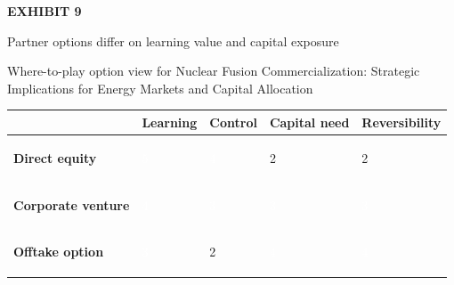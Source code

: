 \documentclass[10pt,a4paper]{article}
\begin{document}
\clearpage
{\textcolor{BOGreen}{\scriptsize\bfseries EXHIBIT 9}}\par\vspace{4pt}
{\sffamily\fontsize{17}{21}\selectfont\color{BONavy} Partner options differ on learning value and capital exposure}\par
{\small\color{BOText} Where-to-play option view for Nuclear Fusion Commercialization: Strategic Implications for Energy Markets and Capital Allocation}\par\vspace{6pt}
{\scriptsize\begin{tabular}{p{38mm}>{\centering\arraybackslash}p{21mm}>{\centering\arraybackslash}p{21mm}>{\centering\arraybackslash}p{21mm}>{\centering\arraybackslash}p{21mm}}
 & {\bfseries Learning} & {\bfseries Control} & {\bfseries Capital need} & {\bfseries Reversibility} \\
\hline
{\bfseries Direct equity} & \colorbox{BOGreen}{\textcolor{white}{\strut\hspace{5pt}5\hspace{5pt}}} & \colorbox{BOGreen}{\textcolor{white}{\strut\hspace{5pt}4\hspace{5pt}}} & \colorbox{BOLight}{\textcolor{BOText}{\strut\hspace{5pt}2\hspace{5pt}}} & \colorbox{BOLight}{\textcolor{BOText}{\strut\hspace{5pt}2\hspace{5pt}}} \\
{\bfseries Corporate venture} & \colorbox{BOGreen}{\textcolor{white}{\strut\hspace{5pt}4\hspace{5pt}}} & \colorbox{BOBlue}{\textcolor{white}{\strut\hspace{5pt}3\hspace{5pt}}} & \colorbox{BOBlue}{\textcolor{white}{\strut\hspace{5pt}3\hspace{5pt}}} & \colorbox{BOBlue}{\textcolor{white}{\strut\hspace{5pt}3\hspace{5pt}}} \\
{\bfseries Offtake option} & \colorbox{BOBlue}{\textcolor{white}{\strut\hspace{5pt}3\hspace{5pt}}} & \colorbox{BOLight}{\textcolor{BOText}{\strut\hspace{5pt}2\hspace{5pt}}} & \colorbox{BOGreen}{\textcolor{white}{\strut\hspace{5pt}4\hspace{5pt}}} & \colorbox{BOGreen}{\textcolor{white}{\strut\hspace{5pt}4\hspace{5pt}}} \\

\end{tabular}}
\end{document}
